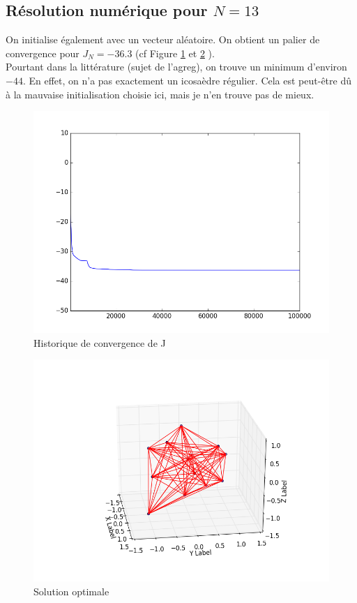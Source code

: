 \documentclass[paper=a4, fontsize=11pt]{article}
\begin{document}
\subsection{Résolution numérique pour $N=13$}
On initialise également avec un vecteur aléatoire. 
On obtient un palier de convergence pour $J_N = -36.3$ (cf Figure \ref{étiquette5} et \ref{étiquette6} ).\\
Pourtant dans la littérature (sujet de l'agreg), on trouve un minimum d'environ $-44$.
En effet, on n'a pas exactement un icosaèdre régulier.
Cela est peut-être dû à la mauvaise initialisation choisie ici, mais je n'en trouve pas de mieux. 
\begin{figure}
 	\begin{center}
   \includegraphics[scale=0.6]{convergence}
   \end{center}
   \caption{\label{étiquette5} Historique de convergence de J}
\end{figure}
\begin{figure}
 	\begin{center}
   \includegraphics[scale=0.6]{icosaedre}
   \end{center}
   \caption{\label{étiquette6} Solution optimale}
\end{figure}
\end{document}
